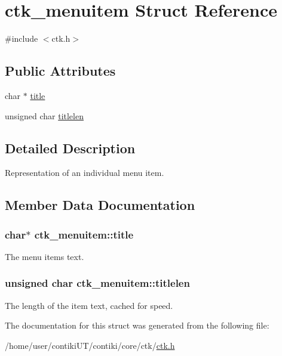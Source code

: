 \hypertarget{structctk__menuitem}{}\section{ctk\+\_\+menuitem Struct Reference}
\label{structctk__menuitem}


{\ttfamily \#include $<$ctk.\+h$>$}

\subsection*{Public Attributes}
\begin{DoxyCompactItemize}
\item 
char $\ast$ \hyperlink{structctk__menuitem_acc0d65695c7d769aa97fa96c7ec359de}{title}
\item 
unsigned char \hyperlink{structctk__menuitem_aea73b4b1269305516200eb325fb31f46}{titlelen}
\end{DoxyCompactItemize}


\subsection{Detailed Description}
Representation of an individual menu item. 

\subsection{Member Data Documentation}
\hypertarget{structctk__menuitem_acc0d65695c7d769aa97fa96c7ec359de}{}
\subsubsection[{title}]{\setlength{\rightskip}{0pt plus 5cm}char$\ast$ ctk\+\_\+menuitem\+::title}\label{structctk__menuitem_acc0d65695c7d769aa97fa96c7ec359de}
The menu items text. \hypertarget{structctk__menuitem_aea73b4b1269305516200eb325fb31f46}{}
\subsubsection[{titlelen}]{\setlength{\rightskip}{0pt plus 5cm}unsigned char ctk\+\_\+menuitem\+::titlelen}\label{structctk__menuitem_aea73b4b1269305516200eb325fb31f46}
The length of the item text, cached for speed. 

The documentation for this struct was generated from the following file\+:\begin{DoxyCompactItemize}
\item 
/home/user/contiki\+U\+T/contiki/core/ctk/\hyperlink{ctk_8h}{ctk.\+h}\end{DoxyCompactItemize}
